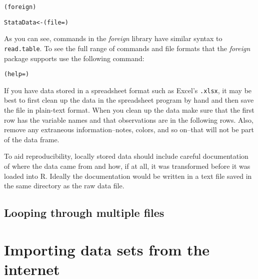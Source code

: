 \begin{knitrout}
\color{fgcolor}\begin{kframe}
\begin{alltt}
(foreign)

StataData <- (file = )
\end{alltt}
\end{kframe}
\end{knitrout}


As you can see, commands in the \emph{foreign} library have similar syntax to \texttt{read.table}. To see the full range of commands and file formats that the \emph{foreign} package supports use the following command:

\begin{knitrout}
\color{fgcolor}\begin{kframe}
\begin{alltt}
(help = )
\end{alltt}
\end{kframe}
\end{knitrout}


If you have data stored in a spreadsheet format such as Excel's \texttt{.xlsx}, it may be best to first clean up the data in the spreadsheet program by hand and then save the file in plain-text format. When you clean up the data make sure that the first row has the variable names and that observations are in the following rows. Also, remove any extraneous information--notes, colors, and so on--that will not be part of the data frame.

To aid reproducibility, locally stored data should include careful documentation of where the data came from and how, if at all, it was transformed before it was loaded into R. Ideally the documentation would be written in a text file saved in the same directory as the raw data file. 

\subsection{Looping through multiple files}


\section{Importing data sets from the internet}

